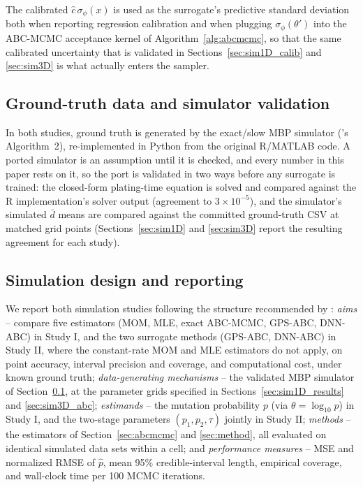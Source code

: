\documentclass[sn-basic,iicol,pdflatex]{sn-jnl}
\newcommand{\dbar}{\ensuremath{\bar d}}
\begin{document}
The calibrated $\hat c\,\sigma_\phi(x)$ is used as the surrogate's predictive
standard deviation both when reporting regression calibration and when
plugging $\sigma_\phi(\theta')$ into the ABC-MCMC acceptance kernel of
Algorithm~\ref{alg:abcmcmc}, so that the same calibrated uncertainty that is
validated in Sections~\ref{sec:sim1D_calib} and \ref{sec:sim3D} is what
actually enters the sampler.

\subsection{Ground-truth data and simulator validation}
\label{sec:validation}

In both studies, ground truth is generated by the exact/slow MBP simulator
(\citeauthor{lu2023}'s Algorithm~2), re-implemented in Python from the original
R/MATLAB code. A ported simulator is an assumption until it is checked, and
every number in this paper rests on it, so the port is validated in two ways
before any surrogate is trained: the closed-form plating-time equation is solved and compared
against the R implementation's solver output (agreement to $3\times10^{-5}$),
and the simulator's simulated $\dbar$ means are compared against the
committed ground-truth CSV at matched grid points (Sections~\ref{sec:sim1D}
and \ref{sec:sim3D} report the resulting agreement for each study).

\subsection{Simulation design and reporting}
\label{sec:ademp}

We report both simulation studies following the structure recommended by
\citet{morris2019}: \emph{aims} -- compare five estimators (MOM, MLE, exact
ABC-MCMC, GPS-ABC, DNN-ABC) in Study I, and the two surrogate methods
(GPS-ABC, DNN-ABC) in Study II, where the constant-rate MOM and MLE
estimators do not apply, on point accuracy, interval precision and coverage,
and computational cost, under known ground truth; \emph{data-generating
mechanisms} -- the validated MBP simulator of Section~\ref{sec:validation}, at
the parameter grids specified in Sections~\ref{sec:sim1D_results} and
\ref{sec:sim3D_abc}; \emph{estimands} -- the mutation probability $p$ (via
$\theta=\log_{10}p$) in Study I, and the two-stage parameters
$(p_1,p_2,\tau)$ jointly in Study II;
\emph{methods} -- the estimators of Section~\ref{sec:abcmcmc} and
\ref{sec:method}, all evaluated on identical simulated data sets within a
cell; and \emph{performance measures} -- MSE and normalized RMSE of $\hat p$,
mean 95\% credible-interval length, empirical coverage, and wall-clock time
per 100 MCMC iterations.
\end{document}
